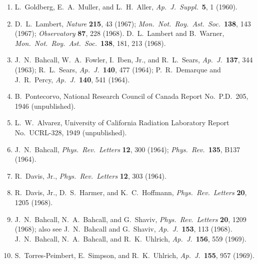 \begin{enumerate}
  \item{}\label{ch15-ref-112}
  L.~Goldberg, E.~A.~Muller, and L.~H.~Aller,
  \emph{Ap.\ J.\ Suppl.}\ \textbf{5}, 1 (1960).

  \item{}\label{ch15-ref-113}
  D.~L.~Lambert, \emph{Nature} \textbf{215}, 43 (1967);
  \emph{Mon.\ Not.\ Roy.\ Ast.\ Soc.}\ \textbf{138}, 143 (1967);
  \emph{Observatory} \textbf{87}, 228 (1968).
  D.~L.~Lambert and B.~Warner,
  \emph{Mon.\ Not.\ Roy.\ Ast.\ Soc.}\ \textbf{138}, 181, 213 (1968).

  \item{}\label{ch15-ref-114}
  J.~N.~Bahcall, W.~A.~Fowler, I.~Iben, Jr., and R.~L.~Sears,
  \emph{Ap.\ J.}\ \textbf{137}, 344 (1963);
  R.~L.~Sears, \emph{Ap.\ J.}\ \textbf{140}, 477 (1964);
  P.~R.~Demarque and J.~R.~Percy,
  \emph{Ap.\ J.}\ \textbf{140}, 541 (1964).

  \item{}\label{ch15-ref-115}
  B.~Pontecorvo, National Research Council of Canada Report No.~P.D.~205,
  1946 (unpublished).

  \item{}\label{ch15-ref-116}
  L.~W.~Alvarez, University of California Radiation Laboratory Report
  No.~UCRL-328, 1949 (unpublished).

  \item{}\label{ch15-ref-117}
  J.~N.~Bahcall, \emph{Phys.\ Rev.\ Letters} \textbf{12}, 300 (1964);
  \emph{Phys.\ Rev.}\ \textbf{135}, B137 (1964).

  \item{}\label{ch15-ref-118}
  R.~Davis, Jr., \emph{Phys.\ Rev.\ Letters} \textbf{12}, 303 (1964).

  \item{}\label{ch15-ref-119}
  R.~Davis, Jr., D.~S.~Harmer, and K.~C.~Hoffmann,
  \emph{Phys.\ Rev.\ Letters} \textbf{20}, 1205 (1968).

  \item{}\label{ch15-ref-120}
  J.~N.~Bahcall, N.~A.~Bahcall, and G.~Shaviv,
  \emph{Phys.\ Rev.\ Letters} \textbf{20}, 1209 (1968);
  also see J.~N.~Bahcall and G.~Shaviv,
  \emph{Ap.\ J.}\ \textbf{153}, 113 (1968).
  J.~N.~Bahcall, N.~A.~Bahcall, and R.~K.~Uhlrich,
  \emph{Ap.\ J.}\ \textbf{156}, 559 (1969).

  \item{}\label{ch15-ref-121}
  S.~Torres-Peimbert, E.~Simpson, and R.~K.~Uhlrich,
  \emph{Ap.\ J.}\ \textbf{155}, 957 (1969).


\end{enumerate}
